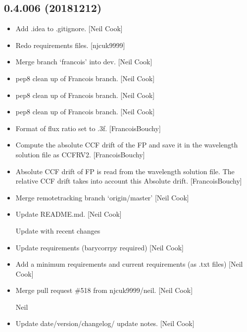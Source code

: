 \documentclass[a4paper,10pt,english]{report}
\begin{document}
\subsection{0.4.006 (2018\sphinxhyphen{}12\sphinxhyphen{}12)}
\label{\detokenize{misc/changelog:id256}}\begin{itemize}
\item {} 
Add .idea to .gitignore. {[}Neil Cook{]}

\item {} 
Re\sphinxhyphen{}do requirements files. {[}njcuk9999{]}

\item {} 
Merge branch ‘francois’ into dev. {[}Neil Cook{]}

\item {} 
 \sphinxhyphen{} pep8 clean up of Francois branch. {[}Neil
Cook{]}

\item {} 
 \sphinxhyphen{} pep8 clean up of Francois branch. {[}Neil
Cook{]}

\item {} 
 \sphinxhyphen{} pep8 clean up of Francois branch. {[}Neil
Cook{]}

\item {} 
Format of flux ratio set to .3f. {[}FrancoisBouchy{]}

\item {} 
Compute the absolute CCF drift of the FP and save it in the wavelength
solution file as CCFRV2. {[}FrancoisBouchy{]}

\item {} 
Absolute CCF drift of FP is read from the wavelength solution file.
The relative CCF drift takes into account this Absolute drift.
{[}FrancoisBouchy{]}

\item {} 
Merge remote\sphinxhyphen{}tracking branch ‘origin/master’ {[}Neil Cook{]}

\item {} 
Update README.md. {[}Neil Cook{]}

Update with recent changes

\item {} 
Update requirements (barycorrpy required) {[}Neil Cook{]}

\item {} 
Add a minimum requirements and current requirements (as .txt files)
{[}Neil Cook{]}

\item {} 
Merge pull request \#518 from njcuk9999/neil. {[}Neil Cook{]}

Neil

\item {} 
Update date/version/changelog/ update notes. {[}Neil Cook{]}

\end{itemize}
\end{document}
